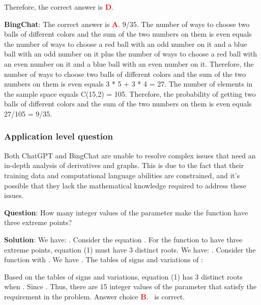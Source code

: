 \documentclass{article}
\begin{document}
{\begin{mdframed}[linewidth=1pt,linecolor=red]
		Therefore, the correct answer is \textcolor{red}{\textbf{D}}. 
		
		\textbf{BingChat}: The correct answer is \textcolor{red}{\textbf{A}}. 9/35. The number of ways to choose two balls of different colors and the sum of the two numbers on them is even equals the number of ways to choose a red ball with an odd number on it and a blue ball with an odd number on it plus the number of ways to choose a red ball with an even number on it and a blue ball with an even number on it. Therefore, the number of ways to choose two balls of different colors and the sum of the two numbers on them is even equals 3 * 5 + 3 * 4 = 27. The number of elements in the sample space equals C(15,2) = 105. Therefore, the probability of getting two balls of different colors and the sum of the two numbers on them is even equals 27/105 = 9/35.
		
	\end{mdframed}
	
	\subsubsection{Application level question}
	\label{VNHSGE_Math_A}
	
	Both ChatGPT and BingChat are unable to resolve complex issues that need an in-depth analysis of derivatives and graphs. This is due to the fact that their training data and computational language abilities are constrained, and it's possible that they lack the mathematical knowledge required to address these issues.
	
	
	
	\begin{mdframed}[linewidth=1pt,linecolor=red]
		\textbf{Question}: How many integer values of the parameter  make the function  have three extreme points? 
		
		\begin{oneparchoices}
		\end{oneparchoices}
		
		\textbf{Solution}: We have: . Consider the equation .
		For the function  to have three extreme points, equation (1) must have 3 distinct roots. We have: .
		Consider the function  with . We have . The tables of signs and variations of :
\begin{center}
		\end{center}
		Based on the tables of signs and variations, equation (1) has 3 distinct roots when .
		Since .
		Thus, there are 15 integer values of the parameter  that satisfy the requirement in the problem. Answer choice \textcolor{red}{\textbf{B}}.~ is correct.
		

\end{mdframed}}
\end{document}
